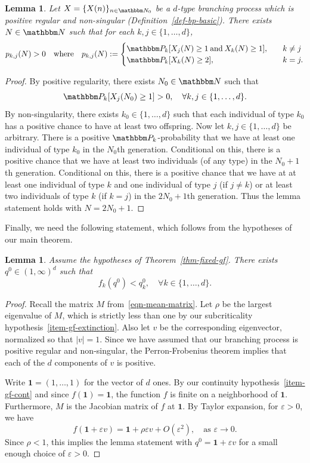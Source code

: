 \documentclass[11pt]{article}
\theoremstyle{plain}
\newtheorem{lem}[thm]{Lemma}
\theoremstyle{definition}
\numberwithin{equation}{section}
\newcommand{\eqb}{\begin{equation}}
\newcommand{\eqe}{\end{equation}}
\newcommand{\eqbn}{\begin{equation*}}
\newcommand{\eqen}{\end{equation*}}
\newcommand{\BB}{\mathbbm}
\newcommand{\bd}{\mathbf}
\newcommand{\ep}{\varepsilon}
\let\originalleft\left
\let\originalright\right
\renewcommand{\left}{\mathopen{}\mathclose\bgroup\originalleft}
\renewcommand{\right}{\aftergroup\egroup\originalright}
\begin{document}
\begin{lem} \label{lem-gf-pos}
Let $X = \{X(n)\}_{n\in\BB N_0}$ be a $d$-type branching process which is positive regular and non-singular (Definition~\ref{def-bp-basic}). There exists $N\in\BB N$ such that for each $k,j  \in \{1,\dots,d\}$, 
\eqb \label{eqn-gf-pos} 
p_{k,j}(N) > 0 \quad \text{where} \quad
p_{k,j}(N) := 
\begin{cases}
\BB P_k\left[X_j(N) \geq 1 \: \text{and} \: X_k(N) \geq 1   \right]  ,\quad & k \not= j  \\
\BB P_k\left[X_k(N) \geq 2   \right]  ,\quad & k = j  . 
\end{cases}  
\eqe 
\end{lem}
\begin{proof} 
By positive regularity, there exists $N_0 \in \BB N$ such that 
\eqbn
\BB P_k\left[ X_j(N_0) \geq 1 \right] > 0 ,\quad\forall k,j \in \{1,\dots,d\}  . 
\eqen
By non-singularity, there exists $k_0  \in  \{1,\dots,d\}$ such that each individual of type $k_0$ has a positive chance to have at least two offspring. Now let $k, j \in \{1,\dots,d\}$ be arbitrary. There is a positive $\BB P_k$-probability that we have at least one individual of type $k_0$ in the $N_0$th generation. Conditional on this, there is a positive chance that we have at least two individuals (of any type) in the $N_0+1$th generation. Conditional on this, there is a positive chance that we have at at least one individual of type $k$ and one individual of type $j$ (if $j\not=k$) or at least two individuals of type $k$ (if $k=j$) in the $2N_0+1$th generation. Thus the lemma statement holds with $N  =2N_0 +1$. 
\end{proof}


Finally, we need the following statement, which follows from the hypotheses of our main theorem. 


\begin{lem} \label{lem-gf-bded}
Assume the hypotheses of Theorem~\ref{thm-fixed-gf}. 
There exists $q^0 \in (1,\infty)^d$ such that 
\eqbn
f_k(q^0) < q^0_k ,\quad\forall k\in \{1,\dots,d\}. 
\eqen
\end{lem}
\begin{proof}
Recall the matrix $M$ from~\eqref{eqn-mean-matrix}. Let $\rho$ be the largest eigenvalue of $M$, which is strictly less than one by our subcriticality hypothesis~\ref{item-gf-extinction}. Also let $v$ be the corresponding eigenvector, normalized so that $|v|=1$. Since we have assumed that our branching process is positive regular and non-singular, the Perron-Frobenius theorem implies that each of the $d$ components of $v$ is positive. 

Write $\bd 1 = (1,\dots,1)$ for the vector of $d$ ones. By our continuity hypothesis~\ref{item-gf-cont} and since $f(\bd 1) = \bd 1$, the function $f$ is finite on a neighborhood of $\bd 1$. Furthermore, $M$ is the Jacobian matrix of $f$ at $\bd 1$. By Taylor expansion, for $\ep > 0$, we have 
\eqbn
f(\bd{1} + \ep v) = \bd{1} + \rho \ep v + O(\ep^2) ,\quad \text{as $\ep \to 0$}. 
\eqen 
Since $\rho < 1$, this implies the lemma statement with $q^0 = \bd 1 + \ep v$ for a small enough choice of $\ep>0$. 
\end{proof}
\end{document}
